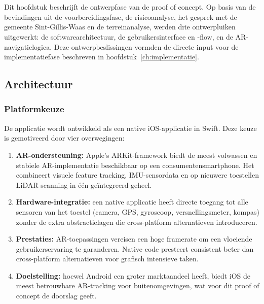 \chapter{}%
\label{ch:ontwerp}

Dit hoofdstuk beschrijft de ontwerpfase van de proof of concept. Op basis van de bevindingen uit de voorbereidingsfase, de risicoanalyse, het gesprek met de gemeente Sint-Gillis-Waas en de terreinanalyse, werden drie ontwerpluiken uitgewerkt: de softwarearchitectuur, de gebruikersinterface en -flow, en de AR-navigatielogica. Deze ontwerpbeslissingen vormden de directe input voor de implementatiefase beschreven in hoofdstuk~\ref{ch:implementatie}.

\section{Architectuur}

\subsection{Platformkeuze}

De applicatie wordt ontwikkeld als een native iOS-applicatie in Swift. Deze keuze is gemotiveerd door vier overwegingen:

\begin{enumerate}
    \item \textbf{AR-ondersteuning:} Apple's ARKit-framework biedt de meest volwassen en stabiele AR-implementatie beschikbaar op een consumentensmartphone. Het combineert visuele feature tracking, IMU-sensordata en op nieuwere toestellen LiDAR-scanning in één geïntegreerd geheel.
    \item \textbf{Hardware-integratie:} een native applicatie heeft directe toegang tot alle sensoren van het toestel (camera, GPS, gyroscoop, versnellingsmeter, kompas) zonder de extra abstractielagen die cross-platform alternatieven introduceren.
    \item \textbf{Prestaties:} AR-toepassingen vereisen een hoge framerate om een vloeiende gebruikerservaring te garanderen. Native code presteert consistent beter dan cross-platform alternatieven voor grafisch intensieve taken.
    \item \textbf{Doelstelling:} hoewel Android een groter marktaandeel heeft, biedt iOS de meest betrouwbare AR-tracking voor buitenomgevingen, wat voor dit proof of concept de doorslag geeft. 
\end{enumerate}

